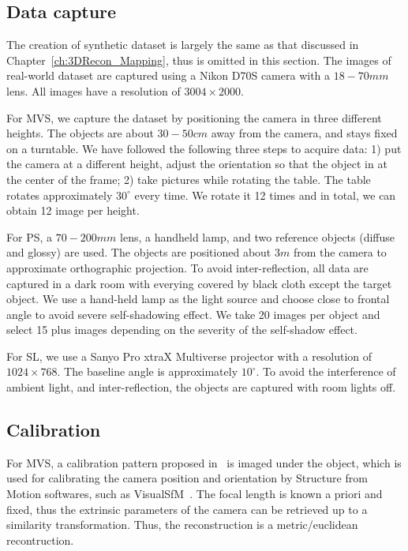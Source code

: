 \subsection{Data capture}
The creation of synthetic dataset is largely the same as that discussed in Chapter~\ref{ch:3DRecon_Mapping}, thus is omitted in this section. The images of real-world dataset are captured using a Nikon D70S camera with a $18-70mm$ lens. All images have a resolution of $3004\times 2000$.

For MVS, we capture the dataset by positioning the camera in three different heights. The objects are about $30-50cm$ away from the camera, and stays fixed on a turntable. We have followed the following three steps to acquire data: 1) put the camera at a different height, adjust the orientation so that the object in at the center of the frame; 2) take pictures while rotating the table. The table rotates approximately $30^\circ$ every time. We rotate it 12 times and in total, we can obtain 12 image per height.

For PS, a $70-200mm$ lens, a handheld lamp, and two reference objects (diffuse and glossy) are used. The objects are positioned about $3m$ from the camera to approximate orthographic projection. To avoid inter-reflection, all data are captured in a dark room with everying covered by black cloth except the target object. We use a hand-held lamp as the light source and choose close to frontal angle to avoid severe self-shadowing effect. We take 20 images per object and select 15 plus images depending on the severity of the self-shadow effect.

For SL, we use a Sanyo Pro xtraX Multiverse projector with a resolution of $1024\times 768$. The baseline angle is approximately $10^\circ$. To avoid the interference of ambient light, and inter-reflection, the objects are captured with room lights off.

\subsection{Calibration}
For MVS, a calibration pattern proposed in~\cite{li2013multiple} is imaged under the object, which is used for calibrating the camera position and orientation by Structure from Motion softwares, such as VisualSfM~\cite{wu2011visualsfm}. The focal length is known a priori and fixed, thus the extrinsic parameters of the camera can be retrieved up to a similarity transformation. Thus, the reconstruction is a metric/euclidean recontruction.

